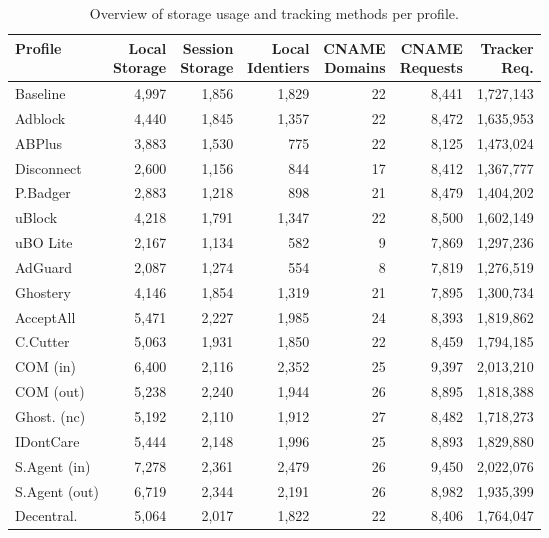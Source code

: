     \begin{table}[H]
    \label{tab:storage-tracking}
    \footnotesize
    \begin{tabular}{lrrrrrr}
    \toprule
    \textbf{Profile} & \shortstack{\textbf{Local}\\\textbf{Storage}} & \shortstack{\textbf{Session}\\\textbf{Storage}} & \shortstack{\textbf{Local}\\\textbf{Identiers}} & \shortstack{\textbf{CNAME}\\\textbf{Domains}} & \shortstack{\textbf{CNAME}\\\textbf{Requests}} & \shortstack{\textbf{Tracker}\\\textbf{Req.}} \\
    \midrule
    Baseline & 4,997 & 1,856 & 1,829 & 22 & 8,441 & 1,727,143 \\
    Adblock & 4,440 & 1,845 & 1,357 & 22 & 8,472 & 1,635,953 \\
    ABPlus & 3,883 & 1,530 & 775 & 22 & 8,125 & 1,473,024 \\
    Disconnect & 2,600 & 1,156 & 844 & 17 & 8,412 & 1,367,777 \\
    P.Badger & 2,883 & 1,218 & 898 & 21 & 8,479 & 1,404,202 \\
    uBlock & 4,218 & 1,791 & 1,347 & 22 & 8,500 & 1,602,149 \\
    uBO Lite & 2,167 & 1,134 & 582 & 9 & 7,869 & 1,297,236 \\
    AdGuard & 2,087 & 1,274 & 554 & 8 & 7,819 & 1,276,519 \\
    Ghostery & 4,146 & 1,854 & 1,319 & 21 & 7,895 & 1,300,734 \\
    AcceptAll & 5,471 & 2,227 & 1,985 & 24 & 8,393 & 1,819,862 \\
    C.Cutter & 5,063 & 1,931 & 1,850 & 22 & 8,459 & 1,794,185 \\
    COM (in) & 6,400 & 2,116 & 2,352 & 25 & 9,397 & 2,013,210 \\
    COM (out) & 5,238 & 2,240 & 1,944 & 26 & 8,895 & 1,818,388 \\
    Ghost. (nc) & 5,192 & 2,110 & 1,912 & 27 & 8,482 & 1,718,273 \\
    IDontCare & 5,444 & 2,148 & 1,996 & 25 & 8,893 & 1,829,880 \\
    S.Agent (in) & 7,278 & 2,361 & 2,479 & 26 & 9,450 & 2,022,076 \\
    S.Agent (out) & 6,719 & 2,344 & 2,191 & 26 & 8,982 & 1,935,399 \\
    Decentral. & 5,064 & 2,017 & 1,822 & 22 & 8,406 & 1,764,047 \\
    \bottomrule
    \end{tabular}
    \caption{Overview of storage usage and tracking methods per profile.}
    \end{table}
    
